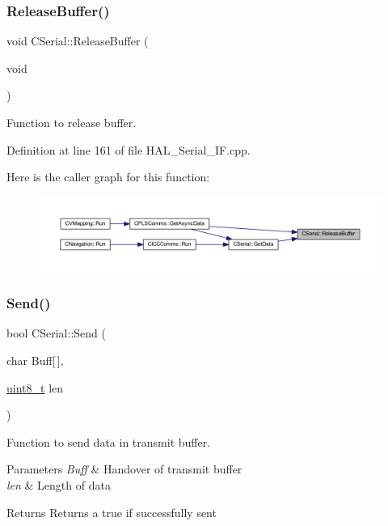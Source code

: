 \subsubsection{\texorpdfstring{ReleaseBuffer()}{ReleaseBuffer()}}
{\footnotesize\ttfamily void C\+Serial\+::\+Release\+Buffer (\begin{DoxyParamCaption}\item[{void}]{ }\end{DoxyParamCaption})}



Function to release buffer. 



Definition at line 161 of file H\+A\+L\+\_\+\+Serial\+\_\+\+I\+F.\+cpp.

Here is the caller graph for this function\+:\nopagebreak
\begin{figure}[H]
\begin{center}
\leavevmode
\includegraphics[width=350pt]{class_c_serial_a941e5cae2ca04518925a3b32f51110a6_icgraph}
\end{center}
\end{figure}
\mbox{\label{class_c_serial_ae5bec6d6a1c75839ae02cf0069d1f08e}} 
\subsubsection{\texorpdfstring{Send()}{Send()}}
{\footnotesize\ttfamily bool C\+Serial\+::\+Send (\begin{DoxyParamCaption}\item[{char}]{Buff\mbox{[}$\,$\mbox{]},  }\item[{\mbox{\hyperlink{_a_d_a_s___types_8h_aba7bc1797add20fe3efdf37ced1182c5}{uint8\+\_\+t}}}]{len }\end{DoxyParamCaption})}



Function to send data in transmit buffer. 


\begin{DoxyParams}{Parameters}
{\em Buff} & Handover of transmit buffer \\
\hline
{\em len} & Length of data \\
\hline
\end{DoxyParams}
\begin{DoxyReturn}{Returns}
Returns a true if successfully sent 
\end{DoxyReturn}


